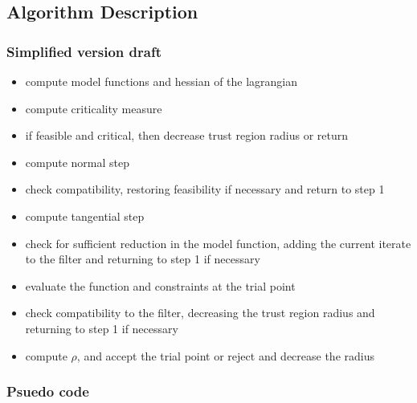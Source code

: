 \documentclass{article} %
\begin{document}
\subsection{Algorithm Description}

\subsubsection{Simplified version draft}

\begin{itemize}
\item compute model functions and hessian of the lagrangian
\item compute criticality measure
\item if feasible and critical, then decrease trust region radius or return
\item compute normal step
\item check compatibility, restoring feasibility if necessary and return to step 1
\item compute tangential step
\item check for sufficient reduction in the model function, adding the current iterate to the filter and returning to step 1 if necessary
\item evaluate the function and constraints at the trial point
\item check compatibility to the filter, decreasing the trust region radius and returning to step 1 if necessary
\item compute $\rho$, and accept the trial point or reject and decrease the radius
\end{itemize}

\subsubsection{Psuedo code}
\end{document}
